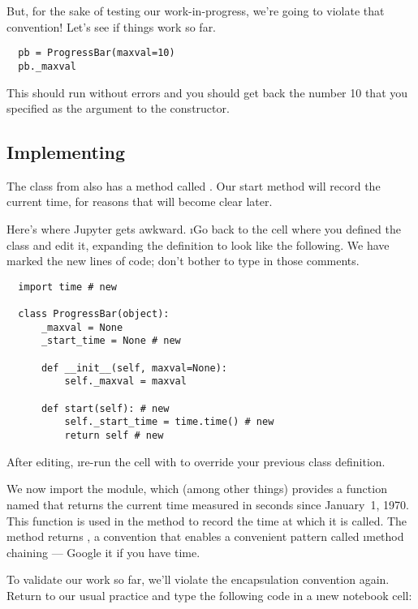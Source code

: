 \documentclass[letterpaper, 12pt, titlepage, twoside]{article}
\begin{document}
But, for the sake of testing our work-in-progress, we're going to violate that
convention! Let's see if things work so far.

\begin{lstlisting}
  pb = ProgressBar(maxval=10)
  pb._maxval
\end{lstlisting}

This should run without errors and you should get back the number 10 that you
specified as the  argument to the constructor.

\subsection*{Implementing }

The  class from  also has a method called
. Our start method will record the current time, for reasons that
will become clear later.

Here's where Jupyter gets awkward. \i{Go back to the cell where you defined
  the  class and edit it}, expanding the definition to look
like the following. We have marked the new lines of code; don't bother to type
in those comments.

\begin{lstlisting}
  import time # new

  class ProgressBar(object):
      _maxval = None
      _start_time = None # new

      def __init__(self, maxval=None):
          self._maxval = maxval

      def start(self): # new
          self._start_time = time.time() # new
          return self # new
\end{lstlisting}

After editing, \i{re-run the cell} with  to override your
previous class definition.

We now import the  module, which (among other things) provides a
function named  that returns the current time measured in seconds
since January~1, 1970. This function is used in the  method to
record the time at which it is called. The  method returns
, a convention that enables a convenient pattern called \i{method
  chaining} --- Google it if you have time.

To validate our work so far, we'll violate the encapsulation convention again.
Return to our usual practice and type the following code in a \i{new} notebook
cell:
\end{document}
